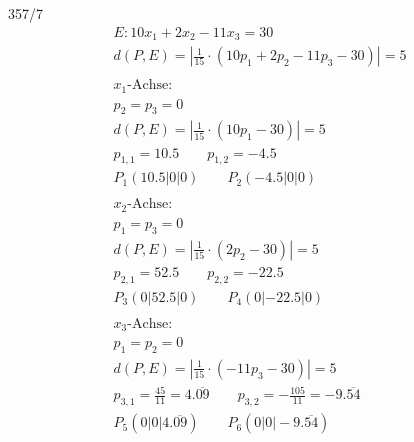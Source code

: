 \begin{exercise}{357/7}
  \begin{gather*}
    E \colon 10x_1 + 2x_2 - 11x_3 = 30 \\
    d(P, E) = \left|\frac{1}{15} \cdot (10p_1 + 2p_2 - 11p_3 - 30)\right| = 5 \\\\
    \text{$x_1$-Achse:} \\
    p_2 = p_3 = 0 \\
    d(P, E) = \left|\frac{1}{15} \cdot (10p_1 - 30)\right| = 5 \\
    p_{1,1} = 10.5 \qquad p_{1,2} = -4.5 \\
    P_1(10.5|0|0) \qquad P_2(-4.5|0|0) \\\\
    \text{$x_2$-Achse:} \\
    p_1 = p_3 = 0 \\
    d(P, E) = \left|\frac{1}{15} \cdot (2p_2 - 30)\right| = 5 \\
    p_{2,1} = 52.5 \qquad p_{2,2} = -22.5 \\
    P_3(0|52.5|0) \qquad P_4(0|-22.5|0) \\\\
    \text{$x_3$-Achse:} \\
    p_1 = p_2 = 0 \\
    d(P, E) = \left|\frac{1}{15} \cdot (-11p_3 - 30)\right| = 5 \\
    p_{3,1} = \frac{45}{11} = 4.\overline{09} \qquad p_{3,2} = -\frac{105}{11} = -9.\overline{54} \\
    P_5(0|0|4.\overline{09}) \qquad P_6(0|0|-9.\overline{54})
  \end{gather*}
\end{exercise}
